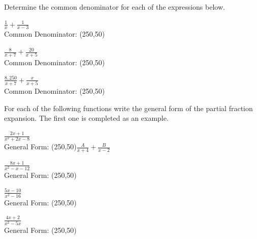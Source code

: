 \begin{problem}
\item Determine the common denominator for each of the expressions below.
  \begin{subproblem}
    \item $\frac{1}{x} + \frac{1}{x-3}$ \\
      Common Denominator: \framebox(250,50){~}
      \vfill
    \item $\frac{8}{x+7} + \frac{20}{x+5}$ \\
      Common Denominator: \framebox(250,50){~}
      \vfill
    \item $\frac{8,250}{x+7} + \frac{x}{x+5}$ \\
      Common Denominator: \framebox(250,50){~}
      \vfill
  \end{subproblem}

  \clearpage

\item For each of the following functions write the general form of
  the partial fraction expansion. The first one is completed as an
  example.
  \begin{subproblem}
    \item $\frac{2x+1}{x^2+2x-8}$ \\
      General Form: \framebox(250,50){$\frac{A}{x+4} + \frac{B}{x-2}$}
    \item $\frac{8x+1}{x^2-x-12}$ \\
      General Form: \framebox(250,50){~}
      \vfill
    \item $\frac{5x-10}{x^2-16}$ \\
      General Form: \framebox(250,50){~}
      \vfill
    \item $\frac{4x+2}{x^2-5x}$ \\
      General Form: \framebox(250,50){~}
      \vfill
  \end{subproblem}

  \clearpage


\end{problem}
